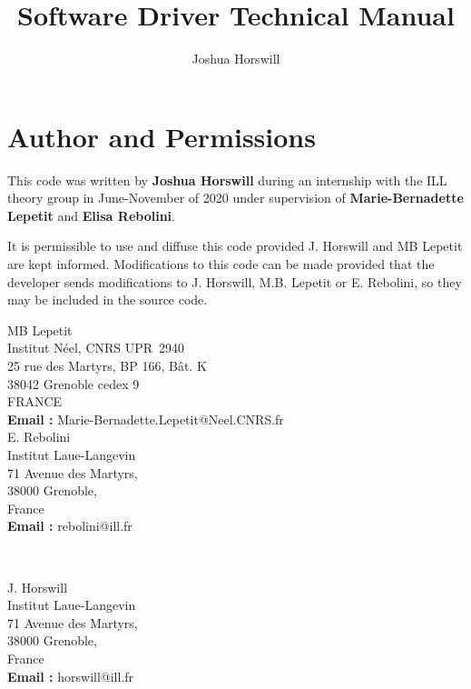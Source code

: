 \documentclass[10pt,a4paper]{article}
\author{Joshua Horswill}
\title{Software Driver Technical Manual}
\begin{document}
\maketitle
\tableofcontents

\newpage 
\section{Author and Permissions}
This code was written by {\bf Joshua Horswill} during an internship with the
ILL theory group in June-November of 2020 under supervision of {\bf
  Marie-Bernadette Lepetit} and {\bf Elisa Rebolini}. 


It is permissible to use and diffuse this code provided J. Horswill and MB
Lepetit are kept informed. Modifications to this code can be made provided
that the developer sends modifications to J. Horswill, M.B. Lepetit or
E. Rebolini, so they may be included in the source code. \\


\noindent 
\begin{minipage}{10cm}
  MB Lepetit \\
  Institut Néel, CNRS UPR~2940 \\                       
  25 rue des Martyrs, BP 166, Bât. K\\
  38042 Grenoble cedex 9 \\
  FRANCE \\[+1ex]                                          
  {\bf Email :} Marie-Bernadette.Lepetit@Neel.CNRS.fr
\\
  E. Rebolini \\
  Institut Laue-Langevin\\            
  71 Avenue des Martyrs,\\  
  38000 Grenoble,\\
  France\\[+1ex]                                          
  {\bf Email :} rebolini@ill.fr  \\
\end{minipage} \hfill 
\\
\begin{minipage}{8cm}
  J. Horswill \\
  Institut Laue-Langevin\\            
  71 Avenue des Martyrs,\\  
  38000 Grenoble,\\
  France\\[+1ex]                                          
  {\bf Email :} horswill@ill.fr  
\end{minipage}
      






\end{document}

